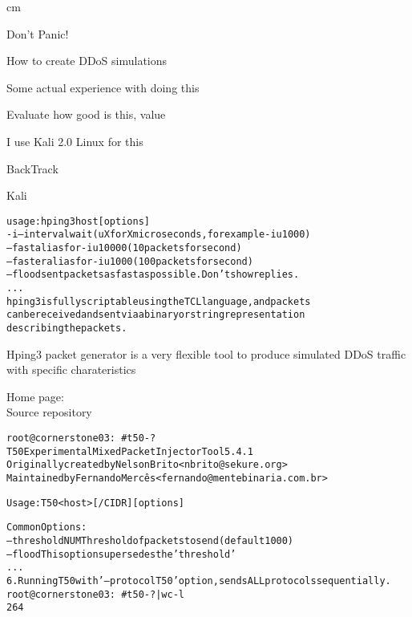 \documentclass[20pt,landscape,a4paper,footrule]{foils}
\begin{document}




 cm

\centerline{\color{titlecolor}\LARGE Don't Panic!}

\begin{list1}
\item How to create DDoS simulations
\item Some actual experience with doing this
\item Evaluate how good is this, value
\end{list1}

\vskip 1cm
\centerline{I use Kali 2.0 Linux for this}



\begin{list1}
\item BackTrack 
\item  Kali 
\end{list1}







\begin{alltt}\small
usage: hping3 host [options]
  -i  --interval  wait (uX for X microseconds, for example -i u1000)
      --fast      alias for -i u10000 (10 packets for second)
      --faster    alias for -i u1000 (100 packets for second)
      --flood	   sent packets as fast as possible. Don't show replies.
...
hping3 is fully scriptable using the TCL language, and packets
can be received and sent via a binary or string representation
describing the packets.
\end{alltt}


Hping3 packet generator is a very flexible tool to produce simulated DDoS traffic with specific charateristics

Home page: \\
Source repository 




\begin{alltt}\small
root@cornerstone03:~# t50 -?
T50 Experimental Mixed Packet Injector Tool 5.4.1
Originally created by Nelson Brito <nbrito@sekure.org>
Maintained by Fernando Mercês <fernando@mentebinaria.com.br>

Usage: T50 <host> [/CIDR] [options]

Common Options:
    --threshold NUM           Threshold of packets to send     (default 1000)
    --flood                   This option supersedes the 'threshold'
...
6. Running T50 with '--protocol T50' option, sends ALL protocols sequentially.
root@cornerstone03:~# t50 -? | wc -l
264
\end{alltt}
\end{document}
